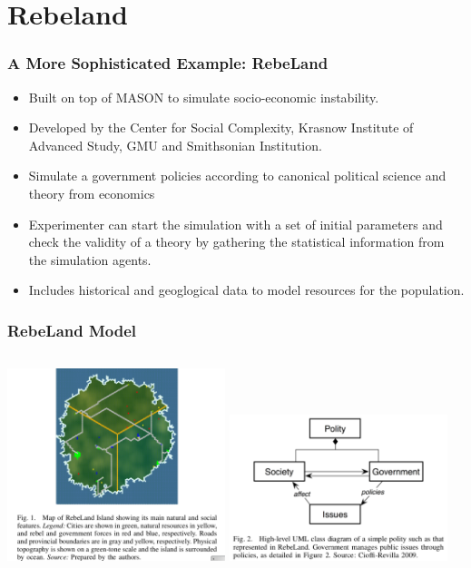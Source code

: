 \documentclass{beamer}
\begin{document}
\section{Rebeland}	%
\begin{frame}
	\frametitle{A More Sophisticated Example: RebeLand}
	\begin{footnotesize}
	\begin{itemize}
		\item Built on top of MASON to simulate socio-economic instability.
		\item Developed by the Center for Social Complexity, Krasnow Institute of Advanced Study, GMU
			and Smithsonian Institution.
		\item Simulate a government policies according to canonical political science and theory from
			economics
		\item Experimenter can start the simulation with a set of initial parameters and check the validity of a theory by gathering the statistical information from the simulation agents.
		\item Includes historical and geoglogical data to model resources for the population.
	\end{itemize}
	\end{footnotesize}
\end{frame}
\begin{frame}
	\frametitle{RebeLand Model}
	\begin{columns}[c]
	\column{2.5in}
		\centering
		\includegraphics[width=2.5in,keepaspectratio]{rebeland-map.pdf}	
	\column{2.5in}
		\centering
		\includegraphics[width=2.5in,keepaspectratio]{rebeland-uml.pdf}	
	\end{columns}
\end{frame}
\end{document}
